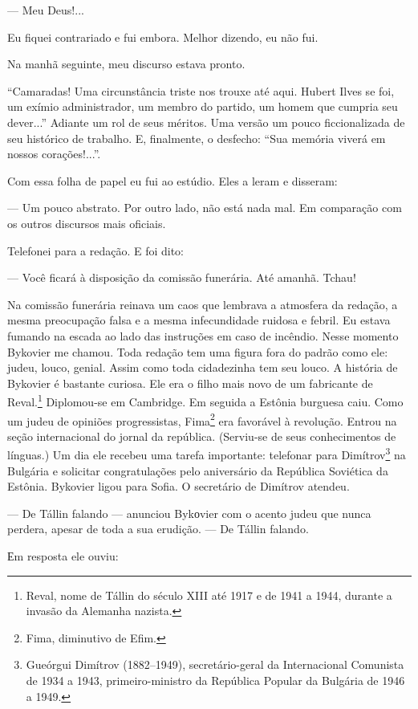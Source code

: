 --- Meu Deus!...

Eu fiquei contrariado e fui embora. Melhor dizendo, eu não fui.

Na manhã seguinte, meu discurso estava pronto.

``Camaradas! Uma circunstância triste nos trouxe até aqui. Hubert Ilves
se foi, um exímio administrador, um membro do partido, um homem que
cumpria seu dever...'' Adiante um rol de seus méritos. Uma versão um
pouco ficcionalizada de seu histórico de trabalho. E, finalmente, o
desfecho: ``Sua memória viverá em nossos corações!...''.

Com essa folha de papel eu fui ao estúdio. Eles a leram e disseram:

--- Um pouco abstrato. Por outro lado, não está nada mal. Em comparação
com os outros discursos mais oficiais.

Telefonei para a redação. E foi dito:

--- Você ficará à disposição da comissão funerária. Até amanhã. Tchau!

Na comissão funerária reinava um caos que lembrava a atmosfera da
redação, a mesma preocupação falsa e a mesma infecundidade ruidosa e
febril. Eu estava fumando na escada ao lado das instruções em caso de
incêndio. Nesse momento Bykovier me chamou. Toda redação tem uma figura
fora do padrão como ele: judeu, louco, genial. Assim como toda
cidadezinha tem seu louco. A história de Bykovier é bastante curiosa.
Ele era o filho mais novo de um fabricante de Reval.\footnote{Reval,
  nome de Tállin do século XIII até 1917 e de 1941 a 1944, durante a
  invasão da Alemanha nazista.} Diplomou-se em Cambridge. Em seguida a
Estônia burguesa caiu. Como um judeu de opiniões progressistas,
Fima\footnote{Fima, diminutivo de Efim.} era favorável à revolução.
Entrou na seção internacional do jornal da república. (Serviu-se de seus
conhecimentos de línguas.) Um dia ele recebeu uma tarefa importante:
telefonar para Dimítrov\footnote{Gueórgui Dimítrov (1882--1949),
  secretário-geral da Internacional Comunista de 1934 a 1943,
  primeiro-ministro da República Popular da Bulgária de 1946 a 1949.} na
Bulgária e solicitar congratulações pelo aniversário da República
Soviética da Estônia. Bykovier ligou para Sofia. O secretário de
Dimítrov atendeu.

--- De Tállin falando --- anunciou Bykоvier com o acento judeu que nunca
perdera, apesar de toda a sua erudição. --- De Tállin falando.

Еm resposta ele ouviu:


